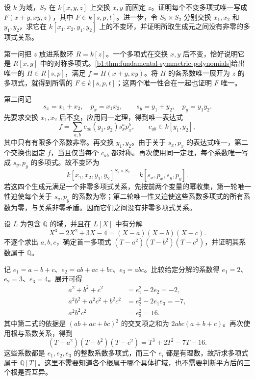 \begin{exercise}\label{b1:ex:12-invariants-fixed-variable}
	设 \(k\) 为域，\(S_2\) 在 \(k[x,y,z]\) 上交换 \(x,y\) 而固定 \(z\)。证明每个不变多项式唯一写成 \(F(x+y,xy,z)\)，其中 \(F\in k[s,p,t]\)。进一步，令 \(S_2\times S_2\) 分别交换 \(x_1,x_2\) 和 \(y_1,y_2\)，求它在 \(k[x_1,x_2,y_1,y_2]\) 上的不变环，并证明所取生成元之间没有非零的多项式关系。
\end{exercise}
\begin{solution}
	第一问把 \(z\) 放进系数环 \(R=k[z]\)。一个多项式在交换 \(x,y\) 后不变，恰好说明它是 \(R[x,y]\) 中的对称多项式。\cref{b1:thm:fundamental-symmetric-polynomials}给出唯一的 \(H\in R[s,p]\)，满足 \(f=H(x+y,xy)\)。将 \(H\) 的各系数唯一展开为 \(z\) 的多项式，就得到所需的 \(F\in k[s,p,t]\)；这两个唯一性合在一起也证明 \(F\) 唯一。

	第二问记
	\[
		s_x=x_1+x_2,\quad p_x=x_1x_2,\qquad s_y=y_1+y_2,\quad p_y=y_1y_2.
	\]
	先要求交换 \(x_1,x_2\) 后不变，应用同一定理，得到唯一表达式
	\[
		f=\sum_{a,b}c_{ab}(y_1,y_2)s_x^ap_x^b, \qquad c_{ab}\in k[y_1,y_2],
	\]
	其中只有有限多个系数非零。再交换 \(y_1,y_2\)。由于关于 \(s_x,p_x\) 的表达式唯一，第二个交换也固定 \(f\)，当且仅当每个 \(c_{ab}\) 都对称。再次使用同一定理，每个系数唯一写成 \(s_y,p_y\) 的多项式。故不变环为
	\[
		k[x_1,x_2,y_1,y_2]^{S_2\times S_2} =k[s_x,p_x,s_y,p_y].
	\]
	若这四个生成元满足一个非零多项式关系，先按前两个变量的幂收集，第一轮唯一性迫使每个关于 \(s_y,p_y\) 的系数为零；第二轮唯一性又迫使这些系数多项式的所有系数为零，与关系非零矛盾。因而它们之间没有非零多项式关系。
\end{solution}

\begin{exercise}\label{b1:ex:12-squared-root-elimination}
	设 \(L\) 为包含 \(\mathbb Q\) 的域，并且在 \(L[X]\) 中有分解
	\[
		X^3-2X^2+3X-4=(X-a)(X-b)(X-c).
	\]
	不逐个求出 \(a,b,c\)，确定首一多项式 \((T-a^2)(T-b^2)(T-c^2)\)，并证明其系数属于 \(\mathbb Q\)。
\end{exercise}
\begin{solution}
	记 \(e_1=a+b+c\)、\(e_2=ab+ac+bc\)、\(e_3=abc\)。比较给定分解的系数得 \(e_1=2\)、\(e_2=3\)、\(e_3=4\)。展开可得
	\[
		\begin{aligned}
			a^2+b^2+c^2&=e_1^2-2e_2=-2,\\
			a^2b^2+a^2c^2+b^2c^2&=e_2^2-2e_1e_3=-7,\\
			a^2b^2c^2&=e_3^2=16.
		\end{aligned}
	\]
	其中第二式的依据是 \((ab+ac+bc)^2\) 的交叉项之和为 \(2abc(a+b+c)\)。再次使用根与系数关系，得到
	\[
		(T-a^2)(T-b^2)(T-c^2)=T^3+2T^2-7T-16.
	\]
	这些系数都是 \(e_1,e_2,e_3\) 的整数系数多项式，而三个 \(e_i\) 都是有理数，故所求多项式属于 \(\mathbb Q[T]\)。这里不需要知道各个根属于哪个具体扩域，也不需要判断平方后的三个根是否互异。
\end{solution}

